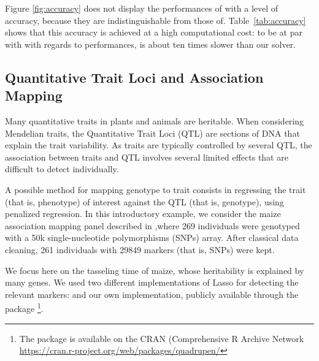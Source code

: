 \sloppypar
Figure \ref{fig:accuracy} does not display the performances of  with a  level of  accuracy, because they are indistinguishable from those of. Table~\ref{tab:accuracy} shows that this accuracy is achieved at 
a high computational cost: to be at par with  with regards to performances,  is about ten times slower than our solver.

\subsection{Quantitative Trait Loci and Association Mapping}

Many quantitative traits in plants and animals are heritable.  When
considering Mendelian traits, the Quantitative Trait Loci (QTL) are sections of
DNA that explain the trait variability.
As traits are typically controlled by several QTL, the association 
between traits and QTL involves several limited effects that are difficult to detect individually.

A possible method for mapping genotype to trait consists in regressing
the trait (that is, phenotype) of interest  against the QTL (that is, genotype), using penalized regression.
%
In this introductory example, we consider the maize association
mapping panel described in \citep{RincentEtAl2014},where 269
individuals were genotyped with a 50k single-nucleotide polymorphisms (SNPs) array. 
After classical data
cleaning, 261 individuals with 29849 markers (that is, SNPs) were kept.
%

We focus here on the tasseling time of maize, whose heritability is explained by many genes.
We used two different implementations of Lasso for detecting the relevant markers:  \citep[Generalized Linear
Models regularized by Lasso and elastic-net,][]{2009_JSS_Friedman} and
our own implementation, 
publicly available through the
 package
%
\footnote{The  package is available on the CRAN (Comprehensive R Archive Network
  {\url{https://cran.r-project.org/web/packages/quadrupen/}}}.

